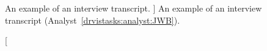 
\begin{figure}
    \centering
    \caption
    [
        An example of an interview transcript.
    ]
    {
        An example of an interview transcript (Analyst~\ref{drvistasks:analyst:JWB}).
    }
    \label{fig:jwbnotes}
    \centering
\end{figure}



